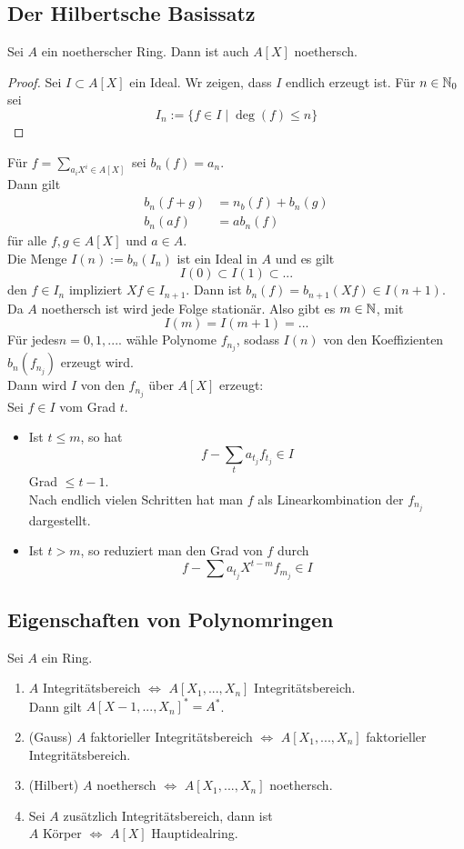 	\subsection{Der Hilbertsche Basissatz}
	\begin{theorem}
		Sei $A$ ein noetherscher Ring. Dann ist auch $A[X]$ noethersch.
	\end{theorem}
	\begin{proof}
		Sei $I\subset A[X]$ ein Ideal. Wr zeigen, dass $I$ endlich erzeugt ist. Für $n\in\mathbb{N}_0$ sei
		\[I_n:=\{f\in I\mid\deg(f)\leq n\}\]
	\end{proof}
	Für $f=\sum_{a_iX^i\in A[X]}$ sei $b_n(f)=a_n$.\\
	Dann gilt
	\begin{align*}
	b_n(f+g)&=n_b(f)+b_n(g)\\
	b_n(af)&=ab_n(f)
	\end{align*}
	für alle $f,g\in A[X]$ und $a\in A$.\\
	Die Menge $I(n):=b_n(I_n)$ ist ein Ideal in $A$ und es gilt
	\[I(0)\subset I(1)\subset...\]
	den $f\in I_n$ impliziert $Xf\in I_{n+1}$. Dann ist $b_n(f)=b_{n+1}(Xf)\in I(n+1)$.\\
	Da $A$ noethersch ist wird jede Folge stationär. Also gibt es $m\in\mathbb{N}$, mit 
	\[I(m)=I(m+1)=...\]
	Für jedes$ n=0,1,....$ wähle Polynome $f_{n_j}$, sodass $I(n)$ von den Koeffizienten $b_n(f_{n_j})$ erzeugt wird.\\
	Dann wird $I$ von den $f_{n_j}$ über $A[X]$ erzeugt:\\
	Sei $f\in I$ vom Grad $t$. 
	\begin{itemize}
		\item Ist $t\leq m$, so hat
		\[f-\sum_t a_{t_j} f_{t_j}\in I\]
		Grad $\leq t-1$.\\
		Nach endlich vielen Schritten hat man $f$ als Linearkombination der $f_{n_j}$ dargestellt. 
		\item Ist $t>m$, so reduziert man den Grad von $f$ durch
		\[f-\sum a_{t_j}X^{t-m}f_{m_j}\in I\]
	\end{itemize}

	\subsection{Eigenschaften von Polynomringen}
	Sei $A$ ein Ring.
	\begin{enumerate}
		\item $A$ Integritätsbereich $\Leftrightarrow$ $A[X_1,...,X_n]$ Integritätsbereich.\\
		Dann gilt $A[X-1,...,X_n]^*=A^*$.
		\item (Gauss) $A$ faktorieller Integritätsbereich $\Leftrightarrow$ $A[X_1,...,X_n]$ faktorieller Integritätsbereich.
		\item (Hilbert) $A$ noethersch $\Leftrightarrow$ $A[X_1,...,X_n]$ noethersch.
		\item Sei $A$ zusätzlich Integritätsbereich, dann ist\\
		$A$ Körper $\Leftrightarrow$ $A[X]$ Hauptidealring.
	\end{enumerate}

